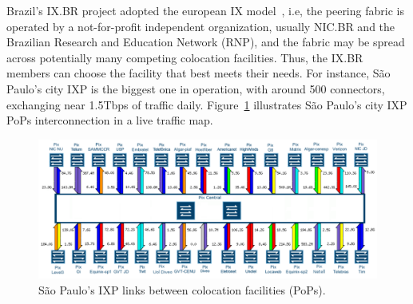 \documentclass[12pt]{article}
\begin{document}
Brazil's IX.BR project adopted the european IX model~\cite{euroix2012}, i.e, the peering fabric is operated by a not-for-profit independent organization, usually NIC.BR and the Brazilian Research and Education Network (RNP), and the fabric may be spread across potentially many competing colocation facilities. Thus, the IX.BR members can choose the facility that best meets their needs. For instance, São Paulo's city IXP is the biggest one in operation, with around 500 connectors, exchanging near 1.5Tbps of traffic daily. Figure~\ref{fig:pttsp} illustrates São Paulo's city IXP PoPs interconnection in a live traffic map.
\begin{figure}
\centering
\includegraphics[scale=0.4]{imagens/ptt-sp} 
\caption{São Paulo's IXP links between colocation facilities (PoPs).}
\label{fig:pttsp}
\end{figure}


\end{document}
